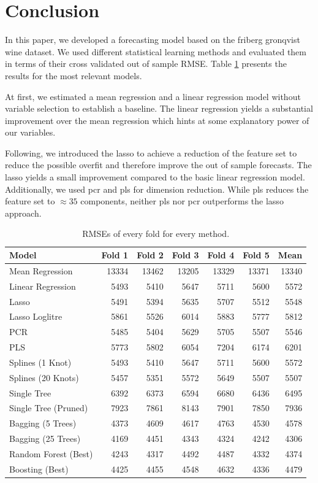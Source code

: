\documentclass[11pt,]{article}
\begin{document}
\hypertarget{conclusion}{%
\section{\texorpdfstring{Conclusion
\label{chap:conc}}{Conclusion }}\label{conclusion}}

In this paper, we developed a forecasting model based on the friberg
gronqvist wine dataset. We used different statistical learning methods
and evaluated them in terms of their cross validated out of sample
\ac{RMSE}. Table \ref{tab:RMSESum} presents the results for the most
relevant models.

At first, we estimated a mean regression and a linear regression model
without variable selection to establish a baseline. The linear
regression yields a substantial improvement over the mean regression
which hints at some explanatory power of our variables.

Following, we introduced the \ac{lasso} to achieve a reduction of the
feature set to reduce the possible overfit and therefore improve the out
of sample forecasts. The lasso yields a small improvement compared to
the basic linear regression model. Additionally, we used \ac{pcr} and
\ac{pls} for dimension reduction. While \ac{pls} reduces the feature set
to \(\approx35\) components, neither \ac{pls} nor \ac{pcr} outperforms
the \ac{lasso} approach.

\begin{table}[t]

\caption{\label{tab:RMSE}\label{tab:RMSESum}RMSEs of every fold for every method.}
\centering
\begin{tabular}{lrrrrrr}
\toprule
Model & Fold 1 & Fold 2 & Fold 3 & Fold 4 & Fold 5 & Mean\\
\midrule
Mean Regression & 13334 & 13462 & 13205 & 13329 & 13371 & 13340\\
Linear Regression & 5493 & 5410 & 5647 & 5711 & 5600 & 5572\\
Lasso & 5491 & 5394 & 5635 & 5707 & 5512 & 5548\\
Lasso Loglitre & 5861 & 5526 & 6014 & 5883 & 5777 & 5812\\
PCR & 5485 & 5404 & 5629 & 5705 & 5507 & 5546\\
\addlinespace
PLS & 5773 & 5802 & 6054 & 7204 & 6174 & 6201\\
Splines (1 Knot) & 5493 & 5410 & 5647 & 5711 & 5600 & 5572\\
Splines (20 Knots) & 5457 & 5351 & 5572 & 5649 & 5507 & 5507\\
Single Tree & 6392 & 6373 & 6594 & 6680 & 6436 & 6495\\
Single Tree (Pruned) & 7923 & 7861 & 8143 & 7901 & 7850 & 7936\\
\addlinespace
Bagging (5 Trees) & 4373 & 4609 & 4617 & 4763 & 4530 & 4578\\
Bagging (25 Trees) & 4169 & 4451 & 4343 & 4324 & 4242 & 4306\\
Random Forest (Best) & 4243 & 4317 & 4492 & 4487 & 4332 & 4374\\
Boosting (Best) & 4425 & 4455 & 4548 & 4632 & 4336 & 4479\\
\bottomrule
\end{tabular}
\end{table}
\end{document}
